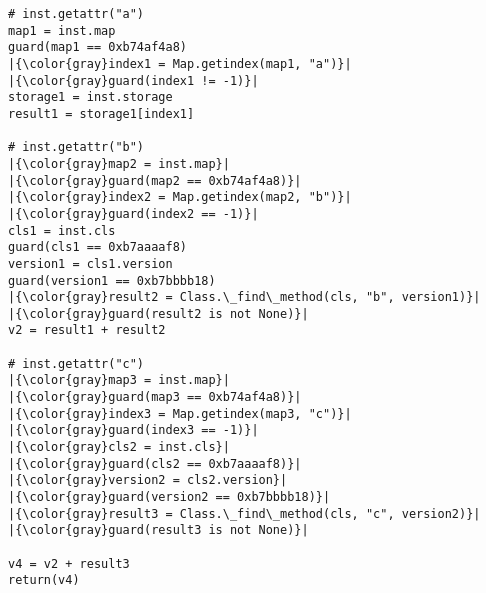 \begin{lstlisting}[escapechar=|,mathescape,basicstyle=\ttfamily]
# inst.getattr("a")
map1 = inst.map
guard(map1 == 0xb74af4a8)
|{\color{gray}index1 = Map.getindex(map1, "a")}|
|{\color{gray}guard(index1 != -1)}|
storage1 = inst.storage
result1 = storage1[index1]

# inst.getattr("b")
|{\color{gray}map2 = inst.map}|
|{\color{gray}guard(map2 == 0xb74af4a8)}|
|{\color{gray}index2 = Map.getindex(map2, "b")}|
|{\color{gray}guard(index2 == -1)}|
cls1 = inst.cls
guard(cls1 == 0xb7aaaaf8)
version1 = cls1.version
guard(version1 == 0xb7bbbb18)
|{\color{gray}result2 = Class.\_find\_method(cls, "b", version1)}|
|{\color{gray}guard(result2 is not None)}|
v2 = result1 + result2

# inst.getattr("c")
|{\color{gray}map3 = inst.map}|
|{\color{gray}guard(map3 == 0xb74af4a8)}|
|{\color{gray}index3 = Map.getindex(map3, "c")}|
|{\color{gray}guard(index3 == -1)}|
|{\color{gray}cls2 = inst.cls}|
|{\color{gray}guard(cls2 == 0xb7aaaaf8)}|
|{\color{gray}version2 = cls2.version}|
|{\color{gray}guard(version2 == 0xb7bbbb18)}|
|{\color{gray}result3 = Class.\_find\_method(cls, "c", version2)}|
|{\color{gray}guard(result3 is not None)}|

v4 = v2 + result3
return(v4)
\end{lstlisting}
